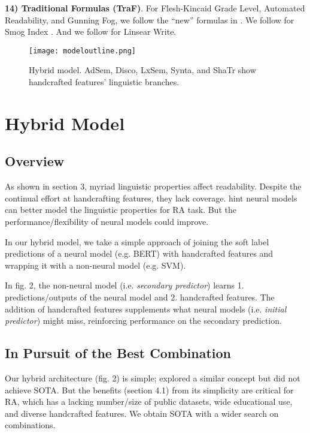\documentclass[11pt]{article}
\begin{document}
\textbf{14) Traditional Formulas (TraF)}. 
For Flesh-Kincaid Grade Level, Automated Readability, and Gunning Fog, we follow the ``new'' formulas in \citet{Kincaid:75}. We follow \citet{si2001statistical} for Smog Index \citep{mc1969smog}. And we follow \citet{eltorai2015readability} for Linsear Write. 

\begin{figure*}[h]
    \centering
    \texttt{[image: modeloutline.png]}
    \caption{Hybrid model. AdSem, Disco, LxSem, Synta, and ShaTr show handcrafted features' linguistic branches.}
    \label{fig:2}
\end{figure*}

\section{Hybrid Model}
\subsection{Overview}
As shown in section 3, myriad linguistic properties affect readability. Despite the continual effort at handcrafting features, they lack coverage. \citet{deutsch-etal-2020-linguistic} hint neural models can better model the linguistic properties for RA task. But the performance/flexibility of neural models could improve. 

In our hybrid model, we take a simple approach of joining the soft label predictions of a neural model (e.g. BERT) with handcrafted features and wrapping it with a non-neural model (e.g. SVM). 

In fig. 2, the non-neural model (i.e. \textit{secondary predictor}) learns 1. predictions/outputs of the neural model and 2. handcrafted features. The addition of handcrafted features supplements what neural models (i.e. \textit{initial predictor}) might miss, reinforcing performance on the secondary prediction.

\subsection{In Pursuit of the Best Combination}
Our hybrid architecture (fig. 2) is simple; \citet{deutsch-etal-2020-linguistic} explored a similar concept but did not achieve SOTA. But the benefits (section 4.1) from its simplicity are critical for RA, which has a lacking number/size of public datasets, wide educational use, and diverse handcrafted features. We obtain SOTA with a wider search on combinations. 
\end{document}
